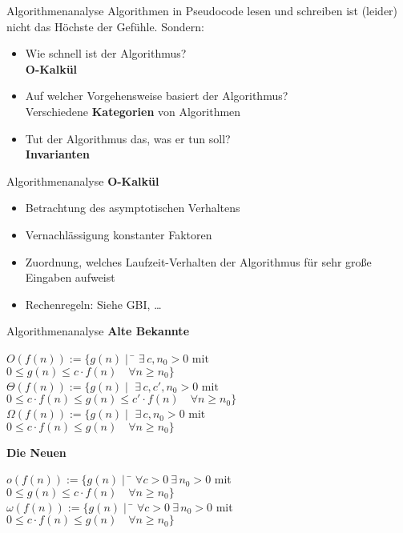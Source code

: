 \begin{frame}{Algorithmenanalyse}
	Algorithmen in Pseudocode lesen und schreiben ist (leider) nicht das Höchste der Gefühle. Sondern:
	\pause
	\begin{itemize}[<+->]
		\item Wie schnell ist der Algorithmus? \\
			\impl \textbf{O-Kalkül}
		\item Auf welcher Vorgehensweise basiert der Algorithmus? \\
			\impl Verschiedene \textbf{Kategorien} von Algorithmen
		\item Tut der Algorithmus das, was er tun soll? \\
			\impl \textbf{Invarianten}
	\end{itemize}
\end{frame}


\begin{frame}{Algorithmenanalyse}
	\textbf{O-Kalkül} \\
	\begin{itemize}
		\item Betrachtung des asymptotischen Verhaltens
		\item Vernachlässigung konstanter Faktoren
		\item Zuordnung, welches Laufzeit-Verhalten der Algorithmus für sehr große Eingaben aufweist
		\item Rechenregeln: Siehe GBI, \dots
	\end{itemize}
\end{frame}


\begin{frame}{Algorithmenanalyse}
	\textbf{Alte Bekannte} \\ \vspace{-.7\baselineskip}
	\begin{tabbing}
		$O(f(n)) := \{ g(n) \mid $ \= $\exists\, c, n_0 > 0\text{ mit }$ \\
					\> $0 \leq g(n) \leq c \cdot f(n) \quad \forall n \geq n_0 \}$ \\
		$\Theta(f(n)) := \{ g(n) \mid $ \> $ \exists\, c, c', n_0 > 0\text{ mit }$ \\
					\> $0 \leq c \cdot f(n) \leq g(n) \leq c' \cdot f(n) \quad \forall n \geq n_0 \}$ \\
		$\Omega(f(n)) := \{ g(n) \mid $ \> $\exists\, c, n_0 > 0\text{ mit }$ \\
					\> $0 \leq c \cdot f(n) \leq g(n) \quad \forall n \geq n_0 \}$ 
	\end{tabbing} 
	\pause
	\smallskip
	\textbf{Die Neuen} \\ \vspace{-.7\baselineskip}
	\begin{tabbing}
		$o(f(n)) := \{g(n) \mid $ \= $\forall c > 0 \ \exists\, n_0 > 0$ mit \\
		\> $ 0 \leq g(n) \leq c \cdot f(n) \quad \forall n \geq n_0 \}$ \\
		$\omega (f(n)) := \{g(n) \mid $ \= $ \forall c > 0 \ \exists\, n_0 > 0$ mit \\
		\> $ 0 \leq c \cdot f(n) \leq g(n) \quad \forall n \geq n_0 \}$
	\end{tabbing}
\end{frame}

